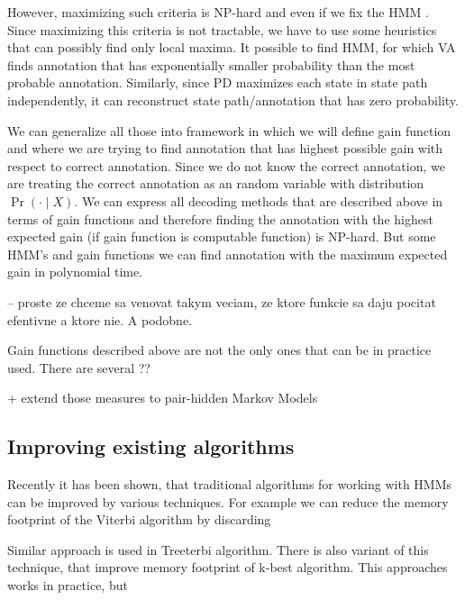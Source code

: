 However, maximizing such criteria is NP-hard \cite{} and even if we fix the
HMM \cite{Brejova2005}. Since maximizing this criteria is not tractable, we have
to use some heuristics that can possibly find only local maxima. It possible to
find HMM, for which VA finds annotation that has exponentially smaller
probability than the most probable annotation. Similarly, since PD maximizes
each state in state path independently, it can reconstruct state path/annotation
that has zero probability.

We can generalize all those into framework in which we will define gain function
and where we are trying to find annotation that has highest possible gain with
respect to correct annotation. Since we do not know the correct annotation, we
are treating the correct annotation as an random variable with distribution
$\Pr\left(\cdot\mid X\right)$. We can express all decoding methods that are
described above in terms of gain functions and therefore finding the annotation
with the highest expected gain (if gain function is computable function) is
NP-hard. But some HMM's and gain functions we can find annotation with the
maximum expected gain in polynomial time. 

-- proste ze chceme sa venovat takym veciam, ze ktore funkcie sa daju pocitat
efentivne a ktore nie. A podobne.

Gain functions described above are not the only ones that can be in practice
used. There are several ??

+ extend those measures to pair-hidden Markov Models


%

\subsection{Improving existing algorithms}

Recently it has been shown, that traditional algorithms for working with HMMs
can be improved by various techniques. For example we can reduce the memory
footprint of the Viterbi algorithm by discarding 

Similar approach is used in Treeterbi algorithm. There is also variant of this
technique, that improve memory footprint of k-best algorithm. This approaches
works in practice, but 

